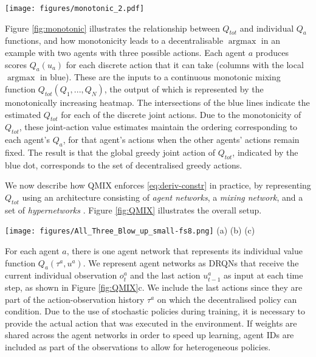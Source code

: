 \documentclass[twoside,11pt]{article}
\DeclareMathOperator*{\argmax}{argmax}
\renewcommand{\cite}{\citep}
\begin{document}
\begin{figure*}[t]
	\centering
	\texttt{[image: figures/monotonic\_2.pdf]}
	\caption{The discrete per-agent action-value scores $Q_a$ are fed into the monotonic 
		function $Q_{tot}(Q_1, Q_2)$. The maximum $Q_a$ for each agent is shown in blue, which corresponds to the maximum $Q_{tot}$ also shown in blue. The constraint \eqref{eq:argmax_constist} is 
		satisfied due to the monotonicity of $Q_{tot}$. 
	}
	\label{fig:monotonic}
\end{figure*}

Figure \ref{fig:monotonic} illustrates the relationship between $Q_{tot}$ and individual $Q_a$ functions, and how monotonicity leads to a decentralisable $\argmax$ in an example with two 
agents with three possible actions.
Each agent $a$ produces scores $Q_a(u_a)$ for each discrete action that it can 
take (columns with the local $\argmax$ in blue).
These are the inputs to a continuous monotonic mixing function 
$Q_{tot}(Q_1,...,Q_N)$, the output of which is represented by the monotonically 
increasing heatmap.
The intersections of the blue lines indicate the estimated $Q_{tot}$ for each 
of the discrete joint actions.
Due to the monotonicity of $Q_{tot}$, these joint-action value estimates 
maintain the ordering corresponding to each agent's $Q_a$, for that agent's 
actions when the other agents' actions remain fixed.
The result is that the global greedy joint action of $Q_{tot}$, indicated by 
the blue dot, corresponds to the set of decentralised greedy actions. 

We now describe how QMIX enforces \eqref{eq:deriv-constr} in practice, by 
representing $Q_{tot}$ using an architecture consisting of \textit{agent 
networks}, a \textit{mixing network}, and a set of \emph{hypernetworks} 
\cite{ha_hypernetworks_2016}.
Figure \ref{fig:QMIX} illustrates the overall setup.

\begin{figure*}[t]
	\centering
	\texttt{[image: figures/All\_Three\_Blow\_up\_small-fs8.png]}
	\text{~~~~~~~~~~~~~}(a) \hfill (b) \hfill (c) 
	\text{~~~~~~~~~~}
	\caption{(a) Mixing network structure. In red are the hypernetworks that 
	produce the weights and biases for mixing network layers shown in blue. (b) 
	The overall QMIX architecture. (c) Agent network structure. Best viewed in 
	colour.}
	\label{fig:QMIX}
\end{figure*}

For each agent $a$, there is one agent network that represents its individual value function $Q_a (\tau^a, u^a)$. We represent agent networks as DRQNs that receive the current individual observation $o^a_t$ and the last action $u^a_{t-1}$ as input at each time step, as shown in Figure \ref{fig:QMIX}c. We include the last actions since they are part of the action-observation history $\tau^a$ on which the decentralised policy can condition. Due to the use of stochastic policies during training, it is necessary to provide the actual action that was executed in the environment. If weights are shared across the agent networks in order to speed up  learning, agent IDs are included as part of the observations to allow for heterogeneous policies. 
\end{document}
